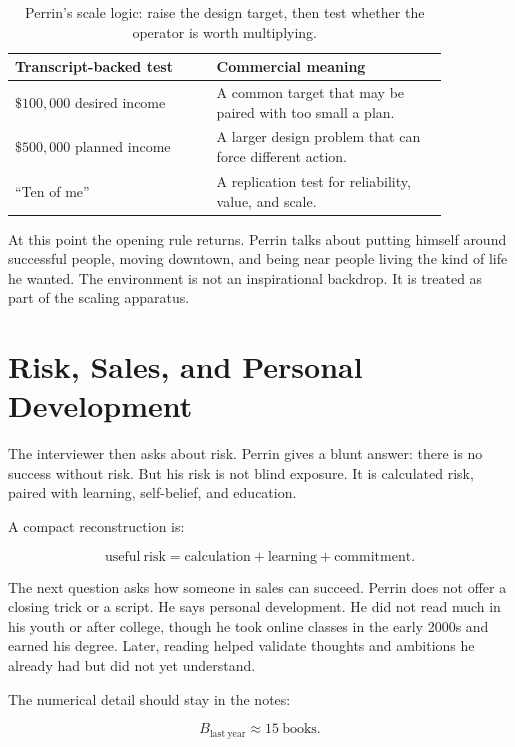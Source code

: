 \begin{table}
\centering
\begin{tabular}{|p{0.40\linewidth}|p{0.46\linewidth}|}
\hline
\textbf{Transcript-backed test} & \textbf{Commercial meaning} \\
\hline
\(\$100{,}000\) desired income & A common target that may be paired with too small a plan. \\
\hline
\(\$500{,}000\) planned income & A larger design problem that can force different action. \\
\hline
``Ten of me'' & A replication test for reliability, value, and scale. \\
\hline
\end{tabular}
\caption{Perrin's scale logic: raise the design target, then test whether the operator is worth multiplying.}
\end{table}

At this point the opening rule returns. Perrin talks about putting himself around successful people, moving downtown, and being near people living the kind of life he wanted. The environment is not an inspirational backdrop. It is treated as part of the scaling apparatus.

\section{Risk, Sales, and Personal Development}

The interviewer then asks about risk. Perrin gives a blunt answer: there is no success without risk. But his risk is not blind exposure. It is calculated risk, paired with learning, self-belief, and education.

A compact reconstruction is:

\begin{equation}
\mathrm{useful\ risk}
=
\mathrm{calculation}
+
\mathrm{learning}
+
\mathrm{commitment}.
\end{equation}

The next question asks how someone in sales can succeed. Perrin does not offer a closing trick or a script. He says personal development. He did not read much in his youth or after college, though he took online classes in the early 2000s and earned his degree. Later, reading helped validate thoughts and ambitions he already had but did not yet understand.

The numerical detail should stay in the notes:

\begin{equation}
B_{\mathrm{last\ year}}\approx 15\ \mathrm{books}.
\end{equation}

